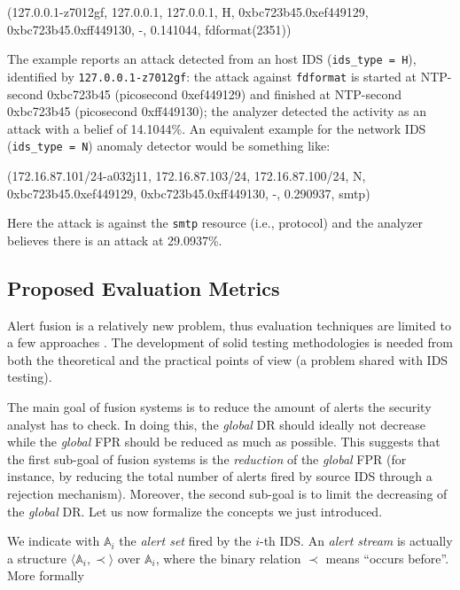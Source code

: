 \begin{center}\footnotesize\ttfamily
  (127.0.0.1-z7012gf, 127.0.0.1, 127.0.0.1, H, 0xbc723b45.0xef449129, 0xbc723b45.0xff449130, -, 0.141044, fdformat(2351))
\end{center}

The example reports an attack detected from an host \ac{IDS} (\texttt{ids\_type = H}), identified by \texttt{127.0.0.1-z7012gf}: the attack against \texttt{fdformat} is started at NTP-second 0xbc723b45 (picosecond 0xef449129) and finished at NTP-second 0xbc723b45 (picosecond 0xff449130); the analyzer detected the activity as an attack with a belief of 14.1044\%. An equivalent example for the network \ac{IDS} (\texttt{ids\_type = N}) anomaly detector would be something like:

\begin{center}\footnotesize\ttfamily
  (172.16.87.101/24-a032j11, 172.16.87.103/24, 172.16.87.100/24, N, 0xbc723b45.0xef449129, 0xbc723b45.0xff449130, -, 0.290937, smtp)
\end{center}

Here the attack is against the \texttt{smtp} resource (i.e., protocol) and the analyzer believes there is an attack at 29.0937\%.

\subsection{Proposed Evaluation Metrics}
\label{correlation:evaluation:framework}
Alert fusion is a relatively new problem, thus evaluation techniques are limited to a few approaches \citep{correlation_evaluation}. The development of solid testing methodologies is needed from both the theoretical and the practical points of view (a problem shared with \ac{IDS} testing).

The main goal of fusion systems is to reduce the amount of alerts the security analyst has to check. In doing this, the \emph{global} \ac{DR} should ideally not decrease while the \emph{global} \ac{FPR} should be reduced as much as possible. This suggests that the first sub-goal of fusion systems is the \emph{reduction} of the \emph{global} \ac{FPR} (for instance, by reducing the total number of alerts fired by source \ac{IDS} through a rejection mechanism). Moreover, the second sub-goal is to limit the decreasing of the \emph{global} \ac{DR}. Let us now formalize the concepts we just introduced.

We indicate with $\mathbb{A}_{i}$ the \emph{alert set} fired by the $i$-th \ac{IDS}. An \emph{alert stream} is actually a structure $\langle\mathbb{A}_{i}, \prec\rangle$ over $\mathbb{A}_{i}$, where the binary relation $\prec$ means ``occurs before''. More formally

